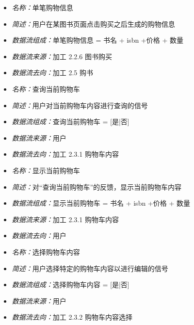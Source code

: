\vspace{-1mm}

\begin{itemize}
	\item \textit{名称：}单笔购物信息
	\item \textit{简述：}用户在某图书页面点击购买之后生成的购物信息
	\item \textit{数据流组成：}单笔购物信息 = 书名 + isbn +价格 + 数量
	\item \textit{数据流来源：}加工 2.2.6 图书购买
	\item \textit{数据流去向：}加工 2.5 购书
\end{itemize}

\vspace{-1mm}

\begin{itemize}
	\item \textit{名称：}查询当前购物车
	\item \textit{简述：}用户对当前购物车内容进行查询的信号
	\item \textit{数据流组成：}查询当前购物车 = [是|否]
	\item \textit{数据流来源：}用户
	\item \textit{数据流去向：}加工 2.3.1 购物车内容
\end{itemize}

\vspace{-1mm}

\begin{itemize}
	\item \textit{名称：}显示当前购物车
	\item \textit{简述：}对“查询当前购物车”的反馈，显示当前购物车内容
	\item \textit{数据流组成：}显示当前购物车 = 书名 + isbn +价格 + 数量
	\item \textit{数据流来源：}加工 2.3.1 购物车内容
	\item \textit{数据流去向：}用户
\end{itemize}

\vspace{-1mm}

\begin{itemize}
	\item \textit{名称：}选择购物车内容
	\item \textit{简述：}用户选择特定的购物车内容以进行编辑的信号
	\item \textit{数据流组成：}选择购物车内容 = [是|否]
	\item \textit{数据流来源：}用户
	\item \textit{数据流去向：}加工 2.3.2 购物车内容选择
\end{itemize}

